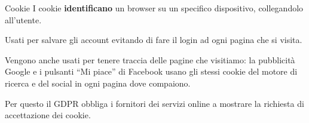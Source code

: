 \begin{myframe}{Cookie}
  I cookie \textbf{identificano} un browser su un specifico dispositivo, collegandolo all'utente.

  Usati per salvare gli account evitando di fare il login ad ogni pagina che si visita.

  \pause\medskip
  Vengono anche usati per tenere traccia delle pagine che visitiamo: la pubblicità Google e i pulsanti ``Mi piace'' di Facebook usano gli stessi cookie del motore di ricerca e del social in ogni pagina dove compaiono.

  Per questo il GDPR obbliga i fornitori dei servizi online a mostrare la richiesta di accettazione dei cookie.
\end{myframe}
